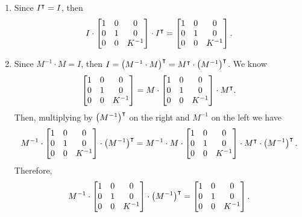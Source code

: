 \documentclass[newpage,hints,handout,noauthor,nooutcomes,12pt]{ximera}
\begin{document}
\begin{problem}
\begin{freeResponse}
\begin{enumerate}
\item Since $I^\intercal = I $, then 
\[
I \cdot \begin{bmatrix}
1 & 0 & 0\\
0 & 1 & 0\\
0 & 0 & K^{-1}%
\end{bmatrix} \cdot
I^\transpose 
= \begin{bmatrix}
1 & 0 & 0\\
0 & 1 & 0\\
0 & 0 & K^{-1}%
\end{bmatrix}.
\]
\item
Since $M^{-1}\cdot M = I$, then $I = \left( M^{-1}\cdot M\right)^\intercal = M^\intercal \cdot \left(M^{-1}\right)^\intercal$. We know
\[
\begin{bmatrix}
1 & 0 & 0\\
0 & 1 & 0\\
0 & 0 & K^{-1}%
\end{bmatrix} =M \cdot \begin{bmatrix}
1 & 0 & 0\\
0 & 1 & 0\\
0 & 0 & K^{-1}%
\end{bmatrix} \cdot M^\transpose.
\]
Then, multiplying by $\left(M^{-1}\right)^\intercal$ on the right and $M^{-1}$ on the left we have 
\[
M^{-1} \cdot \begin{bmatrix}
1 & 0 & 0\\
0 & 1 & 0\\
0 & 0 & K^{-1}%
\end{bmatrix} \cdot  \left(M^{-1}\right)^\transpose
= M^{-1} \cdot M \cdot 
\begin{bmatrix}
1 & 0 & 0\\
0 & 1 & 0\\
0 & 0 & K^{-1}%
\end{bmatrix} \cdot M^\transpose \cdot \left(M^{-1}\right)^\transpose.
\]
Therefore, 
\[
M^{-1} \cdot \begin{bmatrix}
1 & 0 & 0\\
0 & 1 & 0\\
0 & 0 & K^{-1}%
\end{bmatrix} \cdot  \left(M^{-1}\right)^\transpose
= \begin{bmatrix}
1 & 0 & 0\\
0 & 1 & 0\\
0 & 0 & K^{-1}%
\end{bmatrix}.
\]
\end{enumerate}
\end{freeResponse}

\end{problem}
\end{document}
